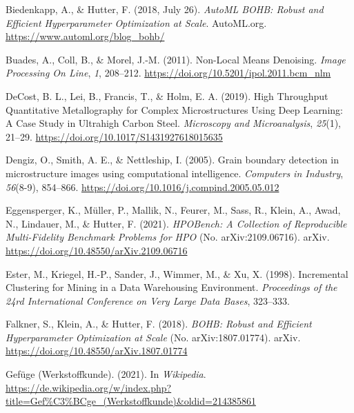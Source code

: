 \documentclass[
  12pt,
]{book}
\newlength{\cslhangindent}
\newlength{\cslentryspacingunit} %
\newenvironment{CSLReferences}[2] %
 {%
  \setlength{\parindent}{0pt}
  \ifodd #1
  \let\oldpar\par
  \def\par{\hangindent=\cslhangindent\oldpar}
  \fi
  \setlength{\parskip}{#2\cslentryspacingunit}
 }%
 {}
\begin{document}
\begin{CSLReferences}{1}{0}
\leavevmode{}%
Biedenkapp, A., \& Hutter, F. (2018, July 26). \emph{{AutoML} \textbar{} {BOHB}: {Robust} and {Efficient Hyperparameter Optimization} at {Scale}}. {AutoML.org}. \url{https://www.automl.org/blog_bohb/}

\leavevmode{}%
Buades, A., Coll, B., \& Morel, J.-M. (2011). Non-{Local Means Denoising}. \emph{Image Processing On Line}, \emph{1}, 208--212. \url{https://doi.org/10.5201/ipol.2011.bcm_nlm}

\leavevmode{}%
DeCost, B. L., Lei, B., Francis, T., \& Holm, E. A. (2019). High {Throughput Quantitative Metallography} for {Complex Microstructures Using Deep Learning}: {A Case Study} in {Ultrahigh Carbon Steel}. \emph{Microscopy and Microanalysis}, \emph{25}(1), 21--29. \url{https://doi.org/10.1017/S1431927618015635}

\leavevmode{}%
Dengiz, O., Smith, A. E., \& Nettleship, I. (2005). Grain boundary detection in microstructure images using computational intelligence. \emph{Computers in Industry}, \emph{56}(8-9), 854--866. \url{https://doi.org/10.1016/j.compind.2005.05.012}

\leavevmode{}%
Eggensperger, K., Müller, P., Mallik, N., Feurer, M., Sass, R., Klein, A., Awad, N., Lindauer, M., \& Hutter, F. (2021). \emph{{HPOBench}: {A Collection} of {Reproducible Multi-Fidelity Benchmark Problems} for {HPO}} (No. arXiv:2109.06716). {arXiv}. \url{https://doi.org/10.48550/arXiv.2109.06716}

\leavevmode{}%
Ester, M., Kriegel, H.-P., Sander, J., Wimmer, M., \& Xu, X. (1998). Incremental {Clustering} for {Mining} in a {Data Warehousing Environment}. \emph{Proceedings of the 24rd {International Conference} on {Very Large Data Bases}}, 323--333.

\leavevmode{}%
Falkner, S., Klein, A., \& Hutter, F. (2018). \emph{{BOHB}: {Robust} and {Efficient Hyperparameter Optimization} at {Scale}} (No. arXiv:1807.01774). {arXiv}. \url{https://doi.org/10.48550/arXiv.1807.01774}

\leavevmode{}%
Gefüge (Werkstoffkunde). (2021). In \emph{Wikipedia}. \url{https://de.wikipedia.org/w/index.php?title=Gef\%C3\%BCge_(Werkstoffkunde)\&oldid=214385861}


\end{CSLReferences}
\end{document}
